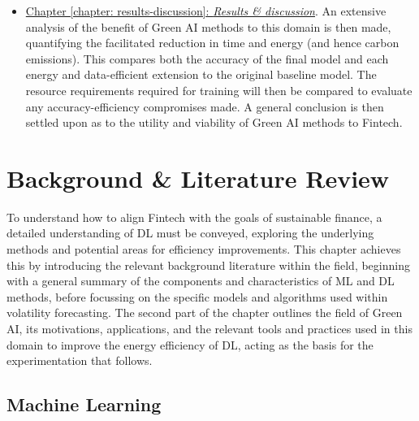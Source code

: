 \documentclass[a4paper, 11pt]{report}
\begin{document}
\begin{itemize}
        \item \underline{Chapter \ref{chapter: results-discussion}: \emph{Results \& discussion}}. An extensive analysis of the benefit of Green AI methods to this domain is then made, quantifying the facilitated reduction in time and energy (and hence carbon emissions). This compares both the accuracy of the final model and each energy and data-efficient extension to the original baseline model. The resource requirements required for training will then be compared to evaluate any accuracy-efficiency compromises made. A general conclusion is then settled upon as to the utility and viability of Green AI methods to Fintech.
    \end{itemize}


    \newpage
    \chapter{Background \& Literature Review}
    \label{chapter: literature}

    To understand how to align Fintech with the goals of sustainable finance, a detailed understanding of DL must be conveyed, exploring the underlying methods and potential areas for efficiency improvements. This chapter achieves this by introducing the relevant background literature within the field, beginning with a general summary of the components and characteristics of ML and DL methods, before focussing on the specific models and algorithms used within volatility forecasting. The second part of the chapter outlines the field of Green AI, its motivations, applications, and the relevant tools and practices used in this domain to improve the energy efficiency of DL, acting as the basis for the experimentation that follows.


    \section{Machine Learning}
\end{document}
